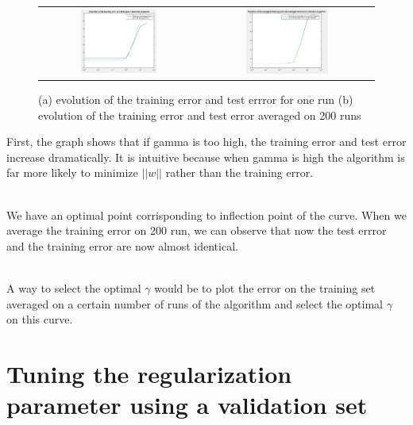 \documentclass{article} %
\begin{document}
  \begin{figure}[H]
\center
\begin{tabular}{cc}
\includegraphics[width=0.5\textwidth]{error4}&\includegraphics[width=0.5\textwidth]{averagederror4}
\end{tabular}
\caption{ (a) evolution of the training error and test errror for one run (b) evolution of the training error and test error averaged on 200 runs}
\end{figure}

First, the graph shows that if gamma is too high, the training error and test error increase dramatically. It is intuitive because when gamma is high the algorithm is far more likely to minimize $||w||$  rather than the training error.

\\We have an optimal point corrisponding to inflection point of the curve. When we average the training error on 200 run, we can observe that now the test errror and the training error are now almost identical.

\\A way to select the optimal $\gamma$ would be to plot the error on the training set averaged on a certain number of runs of the algorithm and select the optimal $\gamma$ on this curve. 


\section{Tuning the regularization parameter using a validation set}
\end{document}
